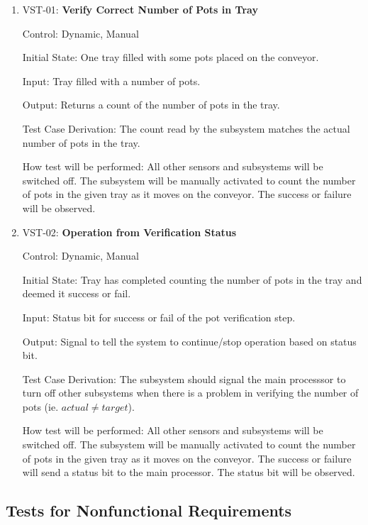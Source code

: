 \documentclass[12pt, titlepage]{article}
\begin{document}
\begin{enumerate}
  \item{VST-01: \textbf{Verify Correct Number of Pots in Tray}}
  
  Control: Dynamic, Manual
            
  Initial State: One tray filled with some pots placed on the conveyor.
            
  Input: Tray filled with a number of pots.
            
  Output: Returns a count of the number of pots in the tray.
  
  Test Case Derivation: The count read by the subsystem matches the actual number
  of pots in the tray.
            
  How test will be performed: All other sensors and subsystems will be switched off. 
  The subsystem will be manually activated to count the number of pots in the given tray as it moves on the conveyor.
  The success or failure will be observed.\\

  \item{VST-02: \textbf{Operation from Verification Status}}
  
  Control: Dynamic, Manual

  Initial State: Tray has completed counting the number of pots in the tray and deemed it success or fail.

  Input: Status bit for success or fail of the pot verification step.

  Output: Signal to tell the system to continue/stop operation based on status bit.

  Test Case Derivation: The subsystem should signal the main processsor to turn off other subsystems
  when there is a problem in verifying the number of pots (ie. $ actual \neq target $).

  How test will be performed: All other sensors and subsystems will be switched off. 
  The subsystem will be manually activated to count the number of pots in the given tray as it moves on the conveyor.
  The success or failure will send a status bit to the main processor. The status bit will be observed.

\end{enumerate}

\subsection{Tests for Nonfunctional Requirements}
\end{document}
